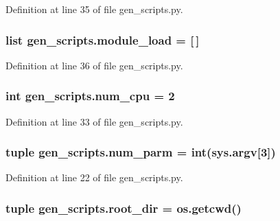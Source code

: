 Definition at line 35 of file gen\+\_\+scripts.\+py.

\hypertarget{namespacegen__scripts_ae30417a9c55d0f80fb830d0b2b905746}{
\subsubsection[{module\+\_\+load}]{\setlength{\rightskip}{0pt plus 5cm}list gen\+\_\+scripts.\+module\+\_\+load = \mbox{[}$\,$\mbox{]}}}\label{namespacegen__scripts_ae30417a9c55d0f80fb830d0b2b905746}


Definition at line 36 of file gen\+\_\+scripts.\+py.

\hypertarget{namespacegen__scripts_a92e23c6e77ee514b72104bc4c77e67b5}{
\subsubsection[{num\+\_\+cpu}]{\setlength{\rightskip}{0pt plus 5cm}int gen\+\_\+scripts.\+num\+\_\+cpu = 2}}\label{namespacegen__scripts_a92e23c6e77ee514b72104bc4c77e67b5}


Definition at line 33 of file gen\+\_\+scripts.\+py.

\hypertarget{namespacegen__scripts_a8dd8aed0ec29ea5536f01d06f00ab25a}{
\subsubsection[{num\+\_\+parm}]{\setlength{\rightskip}{0pt plus 5cm}tuple gen\+\_\+scripts.\+num\+\_\+parm = int(sys.\+argv\mbox{[}3\mbox{]})}}\label{namespacegen__scripts_a8dd8aed0ec29ea5536f01d06f00ab25a}


Definition at line 22 of file gen\+\_\+scripts.\+py.

\hypertarget{namespacegen__scripts_a4107e1299924aa1379f5609bbd7adb0a}{
\subsubsection[{root\+\_\+dir}]{\setlength{\rightskip}{0pt plus 5cm}tuple gen\+\_\+scripts.\+root\+\_\+dir = os.\+getcwd()}}\label{namespacegen__scripts_a4107e1299924aa1379f5609bbd7adb0a}


